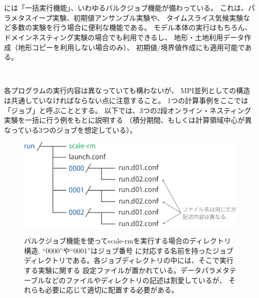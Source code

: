 \section{\SecAdvanceBulkjob} \label{sec:bulkjob}

\scalerm には「一括実行機能」、いわゆるバルクジョブ機能が備わっている。
これは、パラメタスイープ実験、初期値アンサンブル実験や、
タイムスライス気候実験など多数の実験を行う場合に便利な機能である。
\scalerm モデル本体の実行はもちろん、ドメインネスティング実験の場合でも利用できるし、
地形・土地利用データ作成（地形コピーを利用しない場合のみ）、
初期値/境界値作成にも適用可能である。

\\

各プログラムの実行内容は異なっていても構わないが、
MPI並列としての構造は共通していなければならない点に注意すること。
1つの計算事例をここでは「ジョブ」と呼ぶこととする。
以下では、3つの2段オンライン・ネスティング実験を一括に行う例をもとに説明する
（積分期間、もしくは計算領域中心が異なっている3つのジョブを想定している）。


\begin{figure}[t]
\begin{center}
  \includegraphics[width=0.6\hsize]{./figure/bulkjob_directory_structure.eps}\\
  \caption{バルクジョブ機能を使ってscale-rmを実行する場合のディレクトリ構造. ``0000''や``0001''はジョブ番号
           に対応する名前を持ったジョブディレクトリである。各ジョブディレクトリの中には、そこで実行する実験に関する
           設定ファイルが置かれている。データパラメタテーブルなどのファイルやディレクトリの記述は割愛しているが、
           それらも必要に応じて適切に配置する必要がある。}
  \label{fig_bulkjob}
\end{center}
\end{figure}


